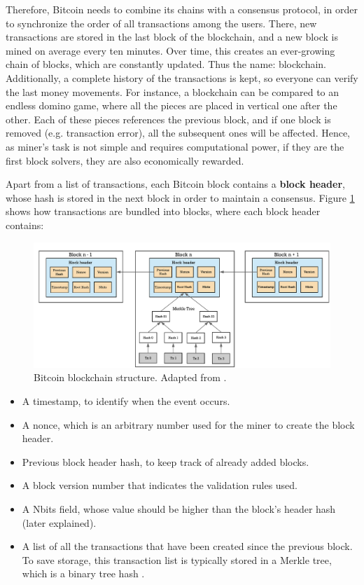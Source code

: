 Therefore, Bitcoin needs to combine its chains with a consensus protocol, in order to synchronize the order of all transactions among the users. There, new transactions are stored in the last block of the blockchain, and a new block is mined on average every ten minutes. Over time, this creates an ever-growing chain of blocks, which are constantly updated. Thus the name: blockchain. Additionally, a complete history of the transactions is kept, so everyone can verify the last money movements. For instance, a blockchain can be compared to an endless domino game, where all the pieces are placed in vertical one after the other. Each of these pieces references the previous block, and if one block is removed (e.g. transaction error), all the subsequent ones will be affected. Hence, as miner's task is not simple and requires computational power, if they are the first block solvers, they are also economically rewarded.

Apart from a list of transactions, each Bitcoin block contains a \textbf{block header}, whose hash is stored in the next block in order to maintain a consensus. Figure \ref{fig:Bitcoin Blockchain mining} shows how transactions are bundled into blocks, where each block header contains:

\begin{figure}[t]
  	\includegraphics[width=1\linewidth]{gfx/mining}    
  	\caption{Bitcoin blockchain structure. Adapted from \citep{hans2017blockchain}.}
  	\label{fig:Bitcoin Blockchain mining}
\end{figure}

\begin{itemize}
	\item A timestamp, to identify when the event occurs.
	\item A nonce, which is an arbitrary number used for the miner to create the block header.
	\item Previous block header hash, to keep track of already added blocks.
	\item A block version number that indicates the validation rules used.
	\item A Nbits field, whose value should be higher than the block's header hash (later explained).
	\item A list of all the transactions that have been created since the previous block. To save storage, this transaction list is typically stored in a Merkle tree, which is a binary tree hash \citep{merkle1987digital}.

\end{itemize}

